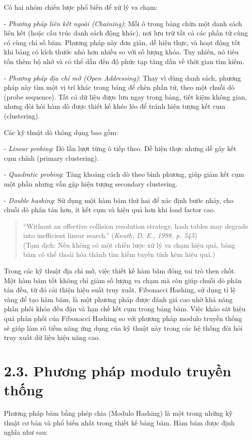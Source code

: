 \documentclass[12pt,a4paper]{report}
\begin{document}
Có hai nhóm chiến lược phổ biến để xử lý va chạm:

- \textit{Phương pháp liên kết ngoài (Chaining)}:
Mỗi ô trong bảng chứa một danh sách liên kết (hoặc cấu trúc danh sách động khác), nơi lưu trữ tất cả các phần tử cùng có cùng chỉ số băm. Phương pháp này đơn giản, dễ hiện thực, và hoạt động tốt khi bảng có kích thước nhỏ hơn nhiều so với số lượng khóa. Tuy nhiên, nó tiêu tốn thêm bộ nhớ và có thể dẫn đến độ phức tạp tăng dần về thời gian tìm kiếm.

- \textit{Phương pháp địa chỉ mở (Open Addressing)}:
Thay vì dùng danh sách, phương pháp này tìm một vị trí khác trong bảng để chèn phần tử, theo một chuỗi dò (probe sequence). Tất cả dữ liệu được lưu ngay trong bảng, tiết kiệm không gian, nhưng đòi hỏi hàm dò được thiết kế khéo léo để tránh hiện tượng kết cụm (clustering).

Các kỹ thuật dò thông dụng bao gồm:

- \textit{Linear probing}: Dò lần lượt từng ô tiếp theo. Dễ hiện thực nhưng dễ gây kết cụm chính (primary clustering).

- \textit{Quadratic probing}: Tăng khoảng cách dò theo bình phương, giúp giảm kết cụm một phần nhưng vẫn gặp hiện tượng secondary clustering.

- \textit{Double hashing}: Sử dụng một hàm băm thứ hai để xác định bước nhảy, cho chuỗi dò phân tán hơn, ít kết cụm và hiệu quả hơn khi load factor cao.
\begin{quote}
“Without an effective collision resolution strategy, hash tables may degrade into inefficient linear search.”
(\textit{Knuth, D. E., 1998, p. 545}) \\
(Tạm dịch: Nếu không có một chiến lược xử lý va chạm hiệu quả, bảng băm có thể thoái hóa thành tìm kiếm tuyến tính kém hiệu quả.)
\end{quote}
\noindent \indent Trong các kỹ thuật địa chỉ mở, việc thiết kế hàm băm đóng vai trò then chốt. Một hàm băm tốt không chỉ giảm số lượng va chạm mà còn giúp chuỗi dò phân tán đều, từ đó cải thiện hiệu suất truy xuất. Fibonacci Hashing, sử dụng tỉ lệ vàng để tạo hàm băm, là một phương pháp được đánh giá cao nhờ khả năng phân phối khóa đều đặn và hạn chế kết cụm trong bảng băm. Việc khảo sát hiệu quả phân phối của Fibonacci Hashing so với phương pháp modulo truyền thống sẽ giúp làm rõ tiềm năng ứng dụng của kỹ thuật này trong các hệ thống đòi hỏi truy xuất dữ liệu hiệu năng cao.

\section*{2.3. Phương pháp modulo truyền thống}
\noindent \indent Phương pháp băm bằng phép chia (Modulo Hashing) là một trong những kỹ thuật cơ bản và phổ biến nhất trong thiết kế bảng băm. Hàm băm được định nghĩa như sau:
\end{document}
